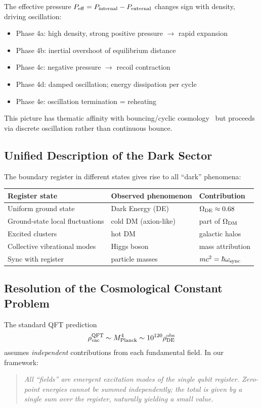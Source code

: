 \documentclass[11pt,a4paper]{article}
\begin{document}
The effective pressure $P_{\rm eff} = P_{\rm internal} - P_{\rm external}$ changes sign with density, driving oscillation:
\begin{itemize}[leftmargin=*]
\item Phase 4a: high density, strong positive pressure $\to$ rapid expansion
\item Phase 4b: inertial overshoot of equilibrium distance
\item Phase 4c: negative pressure $\to$ recoil contraction
\item Phase 4d: damped oscillation; energy dissipation per cycle
\item Phase 4e: oscillation termination = reheating
\end{itemize}

This picture has thematic affinity with bouncing/cyclic cosmology~\cite{Steinhardt2002,LQC} but proceeds via discrete oscillation rather than continuous bounce.

\subsection{Unified Description of the Dark Sector}

The boundary register in different states gives rise to all ``dark'' phenomena:
\begin{table}[h]
\centering
\begin{tabular}{lll}
\toprule
\textbf{Register state} & \textbf{Observed phenomenon} & \textbf{Contribution} \\
\midrule
Uniform ground state & Dark Energy (DE) & $\Omega_{\rm DE} \approx 0.68$ \\
Ground-state local fluctuations & cold DM (axion-like) & part of $\Omega_{\rm DM}$ \\
Excited clusters & hot DM & galactic halos \\
Collective vibrational modes & Higgs boson & mass attribution \\
Sync with register & particle masses & $mc^2 = \hbar\omega_{\rm sync}$ \\
\bottomrule
\end{tabular}
\end{table}

\subsection{Resolution of the Cosmological Constant Problem}

The standard QFT prediction
\begin{equation}
\rho_{\rm vac}^{\rm QFT} \sim M_{\rm Planck}^4 \sim 10^{120} \rho_{\rm DE}^{\rm obs}
\end{equation}
assumes \emph{independent} contributions from each fundamental field. In our framework:
\begin{quote}
\textit{All ``fields'' are emergent excitation modes of the single qubit register. Zero-point energies cannot be summed independently; the total is given by a single sum over the register, naturally yielding a small value.}
\end{quote}
\end{document}
